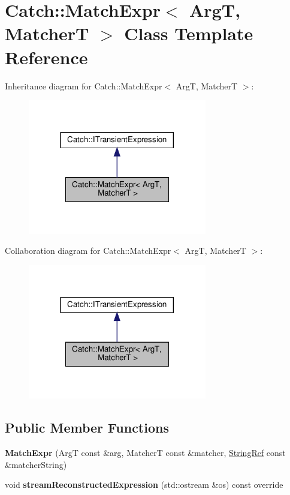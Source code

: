 \hypertarget{classCatch_1_1MatchExpr}{}\section{Catch\+::Match\+Expr$<$ ArgT, MatcherT $>$ Class Template Reference}
\label{classCatch_1_1MatchExpr}


Inheritance diagram for Catch\+::Match\+Expr$<$ ArgT, MatcherT $>$\+:
\nopagebreak
\begin{figure}[H]
\begin{center}
\leavevmode
\includegraphics[width=221pt]{classCatch_1_1MatchExpr__inherit__graph}
\end{center}
\end{figure}


Collaboration diagram for Catch\+::Match\+Expr$<$ ArgT, MatcherT $>$\+:
\nopagebreak
\begin{figure}[H]
\begin{center}
\leavevmode
\includegraphics[width=221pt]{classCatch_1_1MatchExpr__coll__graph}
\end{center}
\end{figure}
\subsection*{Public Member Functions}
\begin{DoxyCompactItemize}
\item 
\mbox{\label{classCatch_1_1MatchExpr_ae55ee9bf46c8676c65e9df291a98c345}} 
{\bfseries Match\+Expr} (ArgT const \&arg, MatcherT const \&matcher, \mbox{\hyperlink{classCatch_1_1StringRef}{String\+Ref}} const \&matcher\+String)
\item 
\mbox{\label{classCatch_1_1MatchExpr_ad3e41adb597750b2219bb37e51185629}} 
void {\bfseries stream\+Reconstructed\+Expression} (std\+::ostream \&os) const override
\end{DoxyCompactItemize}
